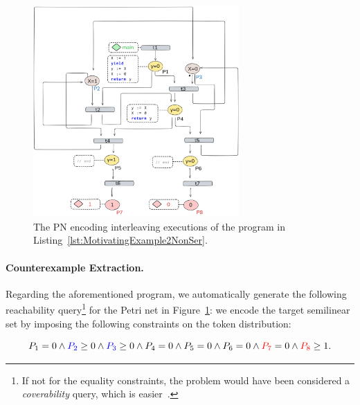 \begin{figure}[!htbp]
	\centering
	\includegraphics[width=0.7\textwidth]{plots/code_2_PN_with_annotation.png}
	\caption{The PN encoding interleaving executions of the program in Listing~\ref{lst:MotivatingExample2NonSer}.}
	\label{fig:code2ExamplePN}
\end{figure}

\paragraph{Counterexample Extraction.}

Regarding the aforementioned program, we automatically generate the following reachability query\footnote{If not for the equality constraints, the problem would have been considered a \textit{coverability} query, which is easier~\cite{Ra78}.} for the Petri net in Figure~\ref{fig:code2ExamplePN}: we encode the target semilinear set by imposing the following constraints on the token distribution:

 

\[
P_1 = 0 \wedge 
\textcolor{blue}{P_2} \ge 0 \wedge \textcolor{blue}{P_3} \ge 0  \wedge P_4 = 0
\wedge P_5 = 0 \wedge P_6 = 0 \wedge \textcolor{red}{P_7} = 0 \wedge \textcolor{red}{P_8} \ge 1.
\]

